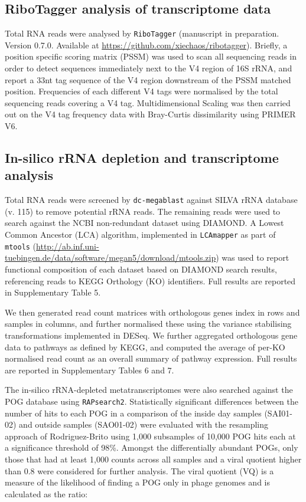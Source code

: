 \subsection{RiboTagger analysis of transcriptome data}

Total RNA reads were analysed by {\tt RiboTagger} (manuscript in preparation. Version 0.7.0. Available at \url{https://github.com/xiechaos/ribotagger}). Briefly, a position specific scoring matrix (PSSM) was used to scan all sequencing reads in order to detect sequences immediately next to the V4 region of 16S rRNA, and report a 33nt tag sequence of the V4 region downstream of the PSSM matched position. Frequencies of each different V4 tags were normalised by the total sequencing reads covering a V4 tag. Multidimensional Scaling was then carried out on the V4 tag frequency data with Bray-Curtis dissimilarity using PRIMER V6. \cite{clarke2006primer}

\subsection{In-silico rRNA depletion and transcriptome analysis}

Total RNA reads were screened by {\tt dc-megablast} against SILVA rRNA database (v. 115) \cite{quast_silva_2013} to remove potential rRNA reads. The remaining reads were used to search against the NCBI non-redundant dataset using DIAMOND. \cite{buchfink_fast_2015} A Lowest Common Ancestor (LCA) algorithm, implemented in {\tt LCAmapper} as part of {\tt mtools} (\url{http://ab.inf.uni-tuebingen.de/data/software/megan5/download/mtools.zip}) was used to report functional composition of each dataset based on DIAMOND search results, referencing reads to KEGG Orthology (KO) identifiers. \cite{kanehisa_kegg:_2000} Full results are reported in Supplementary Table 5.

We then generated read count matrices with orthologous genes index in rows and samples in columns, and further normalised these using the variance stabilising transformations implemented in DESeq. \cite{anders2010differential} We further aggregated orthologous gene data to pathways as defined by KEGG, and computed the average of per-KO normalised read count as an overall summary of pathway expression. Full results are reported in Supplementary Tables 6 and 7.

The in-silico rRNA-depleted metatranscriptomes were also searched against the POG database \cite{kristensen_orthologous_2013} using {\tt RAPsearch2}. \cite{zhao_rapsearch2:_2012} Statistically significant differences between the number of hits to each POG in a comparison of the inside day samples (SAI01-02) and outside samples (SAO01-02) were evaluated with the resampling approach of Rodriguez-Brito \cite{rodriguez-brito_application_2006} using 1,000 subsamples of 10,000 POG hits each at a significance threshold of 98\%. Amongst the differentially abundant POGs, only those that had at least 1,000 counts across all samples and a viral quotient higher than 0.8 were considered for further analysis. The viral quotient (VQ) is a measure of the likelihood of finding a POG only in phage genomes \cite{kristensen_orthologous_2013} and is calculated as the ratio:

